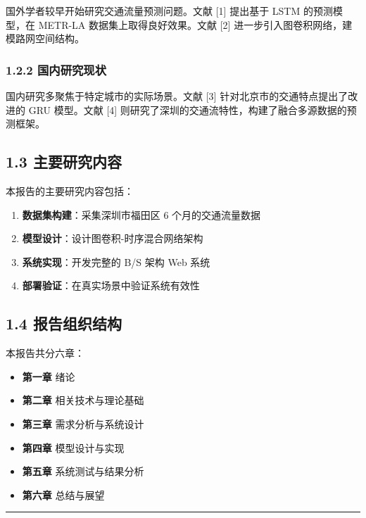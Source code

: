 \documentclass{harryopo-mathnotes}
\begin{document}
国外学者较早开始研究交通流量预测问题。文献 {[}1{]} 提出基于 LSTM
的预测模型，在 METR-LA 数据集上取得良好效果。文献 {[}2{]}
进一步引入图卷积网络，建模路网空间结构。

\subsubsection{1.2.2
国内研究现状}\label{ux56fdux5185ux7814ux7a76ux73b0ux72b6}

国内研究多聚焦于特定城市的实际场景。文献 {[}3{]}
针对北京市的交通特点提出了改进的 GRU 模型。文献 {[}4{]}
则研究了深圳的交通流特性，构建了融合多源数据的预测框架。

\subsection{1.3
主要研究内容}\label{ux4e3bux8981ux7814ux7a76ux5185ux5bb9}

本报告的主要研究内容包括：

\begin{enumerate}
\def\labelenumi{\arabic{enumi}.}
\tightlist
\item
  \textbf{数据集构建}：采集深圳市福田区 6 个月的交通流量数据
\item
  \textbf{模型设计}：设计图卷积-时序混合网络架构
\item
  \textbf{系统实现}：开发完整的 B/S 架构 Web 系统
\item
  \textbf{部署验证}：在真实场景中验证系统有效性
\end{enumerate}

\subsection{1.4
报告组织结构}\label{ux62a5ux544aux7ec4ux7ec7ux7ed3ux6784}

本报告共分六章：

\begin{itemize}
\tightlist
\item
  \textbf{第一章} 绪论
\item
  \textbf{第二章} 相关技术与理论基础
\item
  \textbf{第三章} 需求分析与系统设计
\item
  \textbf{第四章} 模型设计与实现
\item
  \textbf{第五章} 系统测试与结果分析
\item
  \textbf{第六章} 总结与展望
\end{itemize}

\begin{center}\rule{0.5\linewidth}{0.5pt}\end{center}
\end{document}
